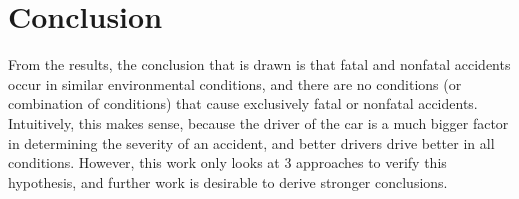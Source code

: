 \documentclass[a4paper, 12pt]{article}
\begin{document}
\section{Conclusion}
From the results, the conclusion that is drawn is that fatal and nonfatal accidents occur in similar environmental conditions, and there are no conditions (or combination of conditions) that cause exclusively fatal or nonfatal accidents. Intuitively, this makes sense, because the driver of the car is a much bigger factor in determining the severity of an accident, and better drivers drive better in all conditions. However, this work only looks at 3 approaches to verify this hypothesis, and further work is desirable to derive stronger conclusions.
\end{document}
